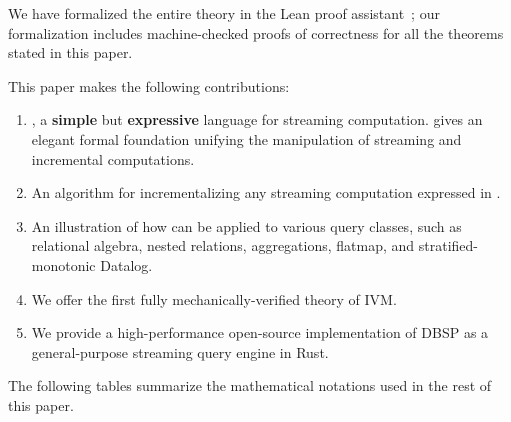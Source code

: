 We have formalized the entire \dbsp theory in the Lean proof
assistant~; our formalization
includes machine-checked proofs of correctness for all the theorems
stated in this paper.

This paper makes the following contributions:
\begin{enumerate}
  \item \dbsp, a \textbf{simple} but \textbf{expressive} language for streaming
  computation. \dbsp gives an elegant formal foundation unifying the manipulation of
  streaming and incremental computations.
  \item An algorithm for incrementalizing any streaming computation expressed in
  \dbsp.
  \item An illustration of how \dbsp can be applied to various query classes, such as relational algebra,
  nested relations, aggregations, flatmap, and stratified-monotonic Datalog.
  \item We offer the first fully mechanically-verified theory of IVM.
  \item We provide a high-performance open-source implementation of DBSP as a
  general-purpose streaming query engine in Rust.
\end{enumerate}

The following tables summarize the mathematical notations used in the rest of this paper.

